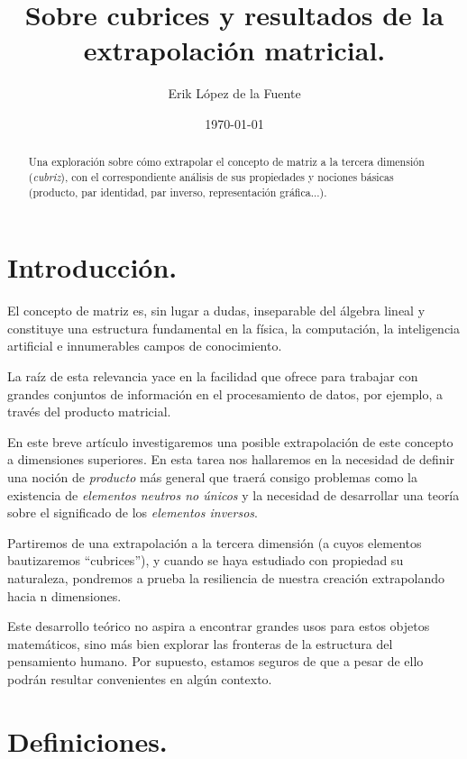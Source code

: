 \documentclass[a4paper, titlepage]{article}
\title{Sobre cubrices y resultados de la extrapolación matricial.}
\author{Erik López de la Fuente}
\date{\today}
\begin{document}
\maketitle

\begin{abstract}
	Una exploración sobre cómo extrapolar el concepto de matriz a la tercera dimensión (\textit{cubriz}), con el correspondiente análisis de sus propiedades y nociones básicas (producto, par identidad, par inverso, representación gráfica...).
\end{abstract}

\tableofcontents
\newpage

\section{Introducción.}

El concepto de matriz es, sin lugar a dudas, inseparable del álgebra lineal y constituye una estructura fundamental en la física, la computación, la inteligencia artificial e innumerables campos de conocimiento.

La raíz de esta relevancia yace en la facilidad que ofrece para trabajar con grandes conjuntos de información en el procesamiento de datos, por ejemplo, a través del producto matricial.

En este breve artículo investigaremos una posible extrapolación de este concepto a dimensiones superiores. En esta tarea nos hallaremos en la necesidad de definir una noción de \textit{producto} más general que traerá consigo problemas como la existencia de \textit{elementos neutros no únicos} y la necesidad de desarrollar una teoría sobre el significado de los \textit{elementos inversos}.

Partiremos de una extrapolación a la tercera dimensión (a cuyos elementos bautizaremos ``cubrices''), y cuando se haya estudiado con propiedad su naturaleza, pondremos a prueba la resiliencia de nuestra creación extrapolando hacia n dimensiones.

Este desarrollo teórico no aspira a encontrar grandes usos para estos objetos matemáticos, sino más bien explorar las fronteras de la estructura del pensamiento humano. Por supuesto, estamos seguros de que a pesar de ello podrán resultar convenientes en algún contexto.

\section{Definiciones.}
\end{document}
